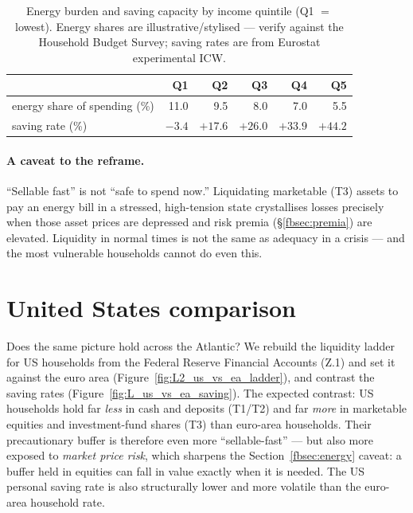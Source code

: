 \documentclass[11pt,a4paper]{article}
\begin{document}
\begin{table}[htbp]\centering\small
\caption{Energy burden and saving capacity by income quintile (Q1 $=$ lowest).
Energy shares are illustrative/stylised --- verify against the Household Budget
Survey; saving rates are from Eurostat experimental ICW.}\label{fbtab:energy}
\begin{tabular}{@{}lrrrrr@{}}
\toprule
 & Q1 & Q2 & Q3 & Q4 & Q5 \\
\midrule
energy share of spending (\%) & 11.0 & 9.5 & 8.0 & 7.0 & 5.5 \\
saving rate (\%) & $-3.4$ & $+17.6$ & $+26.0$ & $+33.9$ & $+44.2$ \\
\bottomrule
\end{tabular}
\end{table}

\paragraph{A caveat to the reframe.} ``Sellable fast'' is not ``safe to spend
now.'' Liquidating marketable (T3) assets to pay an energy bill in a stressed,
high-tension state crystallises losses precisely when those asset prices are
depressed and risk premia (\S\ref{fbsec:premia}) are elevated. Liquidity in normal
times is not the same as adequacy in a crisis --- and the most vulnerable
households cannot do even this.

\section{United States comparison}\label{fbsec:us}

Does the same picture hold across the Atlantic? We rebuild the liquidity ladder
for US households from the Federal Reserve Financial Accounts (Z.1) and set it
against the euro area (Figure~\ref{fig:L2_us_vs_ea_ladder}), and contrast the saving
rates (Figure~\ref{fig:L_us_vs_ea_saving}). The expected contrast: US households
hold far \emph{less} in cash and deposits (T1/T2) and far \emph{more} in
marketable equities and investment-fund shares (T3) than euro-area households.
Their precautionary buffer is therefore even more ``sellable-fast'' --- but also
more exposed to \emph{market price risk}, which sharpens the
Section~\ref{fbsec:energy} caveat: a buffer held in equities can fall in value
exactly when it is needed. The US personal saving rate is also structurally lower
and more volatile than the euro-area household rate.
\end{document}
